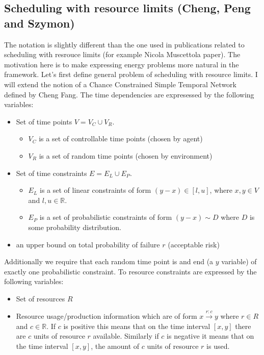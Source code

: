 \documentclass{article}
\begin{document}
\begin{multicols}{2}
\subsection{Scheduling with resource limits (Cheng, Peng and Szymon)}
The notation is slightly different than the one used in publications related to scheduling with resrouce limits (for example Nicola Muscettola
 paper). The motivation here is to make expressing energy problems more natural in the framework.
Let's first define general problem of scheduling with resource limits. I will extend the notion of a Chance Constrained Simple Temporal Network defined by Cheng Fang. The time dependencies are expresessed by the following variables:
\begin{itemize}
\item Set of time points $V = V_C \cup V_R $.
\begin{itemize}
\item $V_C$ is a set of controllable time points (chosen by agent)
\item $V_R$ is a set of random time points (chosen by environment)
\end{itemize}
\item Set of time constraints $E = E_L \cup E_P $.
\begin{itemize}
\item $E_L$ is a set of linear constraints of form $(y-x) \in [l,u]$, where $x,y \in V$ and $l,u \in \mathbb{R}$.
\item $E_P$ is a set of probabilistic constraints of form $ (y-x) \sim D$ where $D$ is some probability distribution.
\end{itemize}
\item an upper bound on total probability of failure $r$ (acceptable risk)
\end{itemize}
Additionally we require that each random time point is and end (a $y$ variable) of exactly one probabilistic constraint.
To resource constraints are expressed by the following variables:
\begin{itemize}
\item Set of resources $R$
\item Resource usage/production information which are of form $x \xrightarrow{r:c} y$ where $r\in R$ and $c \in \mathbb{R}$. If $c$ is positive this means that on the time interval $[x,y]$ there are $c$ units of resource $r$ available. Similarly if $c$ is negative it means that on the time interval $[x,y]$, the amount of $c$ units of resource $r$ is used.
\end{itemize}

\end{multicols}
\end{document}
